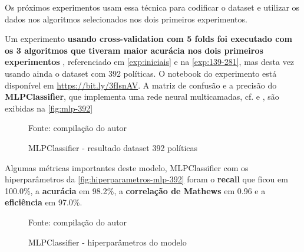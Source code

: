 Os próximos experimentos usam essa técnica para codificar o dataset e utilizar os dados nos algoritmos selecionados nos dois primeiros experimentos.

Um experimento \textbf{usando cross-validation com 5 folds foi executado com os 3 algoritmos que tiveram maior acurácia nos dois primeiros experimentos} , referenciado em \autoref{exp:iniciais} e na \autoref{exp:139-281}, mas desta vez usando ainda o dataset com 392 políticas. O notebook do experimento está disponível em \url{https://bit.ly/3fIsnAV}.
A matriz de confusão e a precisão do \textbf{MLPClassifier}, que implementa uma rede neural multicamadas, cf.  e , são exibidas na \autoref{fig:mlp-392}

\begin{figure}[h!]
	\centering
	\caption{MLPClassifier - resultado dataset 392 políticas}
	
	\label{fig:mlp-392}
	{\scriptsize Fonte: compilação do autor}
\end{figure}

Algumas métricas importantes deste modelo, MLPClassifier com os hiperparâmetros da \autoref{fig:hiperparametros-mlp-392} foram o \textbf{recall} que ficou em 100.0\%, a \textbf{acurácia} em 98.2\%, a \textbf{correlação de Mathews} em 0.96 e a \textbf{eficiência} em 97.0\%. 

\begin{figure}[h!]
	\centering
	\caption{MLPClassifier - hiperparâmetros do modelo}
	
	\label{fig:hiperparametros-mlp-392}
	{\scriptsize Fonte: compilação do autor}
\end{figure}


